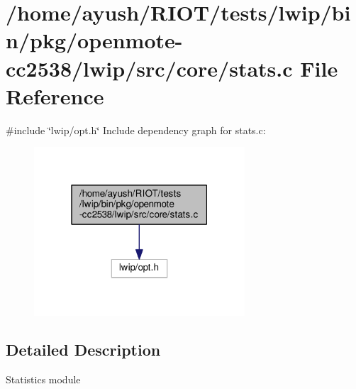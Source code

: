 \hypertarget{openmote-cc2538_2lwip_2src_2core_2stats_8c}{}\section{/home/ayush/\+R\+I\+O\+T/tests/lwip/bin/pkg/openmote-\/cc2538/lwip/src/core/stats.c File Reference}
\label{openmote-cc2538_2lwip_2src_2core_2stats_8c}
{\ttfamily \#include \char`\"{}lwip/opt.\+h\char`\"{}}\newline
Include dependency graph for stats.\+c\+:
\nopagebreak
\begin{figure}[H]
\begin{center}
\leavevmode
\includegraphics[width=223pt]{openmote-cc2538_2lwip_2src_2core_2stats_8c__incl}
\end{center}
\end{figure}


\subsection{Detailed Description}
Statistics module 